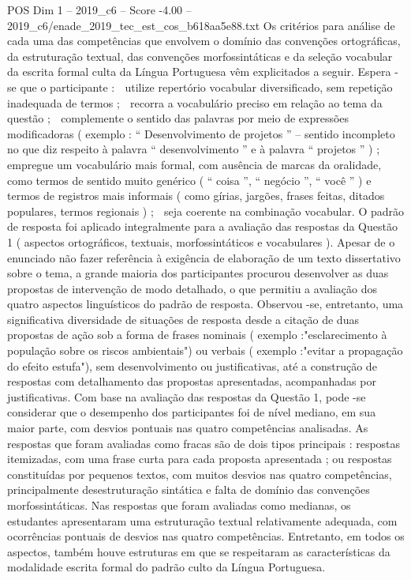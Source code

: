 \begin{textsample}{POS Dim 1 – 2019\_c6 – Score -4.00 – 2019\_c6/enade\_2019\_tec\_est\_cos\_b618aa5e88.txt}
Os critérios para análise de cada uma das competências que envolvem o domínio das convenções ortográficas, da estruturação textual, das convenções morfossintáticas e da seleção vocabular da escrita formal culta da Língua Portuguesa vêm explicitados a seguir.
Espera -se que o participante :  utilize repertório vocabular diversificado, sem repetição inadequada de termos ;  recorra a vocabulário preciso em relação ao tema da questão ;  complemente o sentido das palavras por meio de expressões modificadoras ( exemplo : “ Desenvolvimento de projetos ” – sentido incompleto no que diz respeito à palavra “ desenvolvimento ” e à palavra “ projetos ” ) ;  empregue um vocabulário mais formal, com ausência de marcas da oralidade, como termos de sentido muito genérico ( “ coisa ”, “ negócio ”, “ você ” ) e termos de registros mais informais ( como gírias, jargões, frases feitas, ditados populares, termos regionais ) ;  seja coerente na combinação vocabular.
O padrão de resposta foi aplicado integralmente para a avaliação das respostas da Questão 1 ( aspectos ortográficos, textuais, morfossintáticos e vocabulares ).
Apesar de o enunciado não fazer referência à exigência de elaboração de um texto dissertativo sobre o tema, a grande maioria dos participantes procurou desenvolver as duas propostas de intervenção de modo detalhado, o que permitiu a avaliação dos quatro aspectos linguísticos do padrão de resposta.
Observou -se, entretanto, uma significativa diversidade de situações de resposta desde a citação de duas propostas de ação sob a forma de frases nominais ( exemplo :"esclarecimento à população sobre os riscos ambientais") ou verbais ( exemplo :"evitar a propagação do efeito estufa"), sem desenvolvimento ou justificativas, até a construção de respostas com detalhamento das propostas apresentadas, acompanhadas por justificativas.
Com base na avaliação das respostas da Questão 1, pode -se considerar que o desempenho dos participantes foi de nível mediano, em sua maior parte, com desvios pontuais nas quatro competências analisadas.
As respostas que foram avaliadas como fracas são de dois tipos principais : respostas itemizadas, com uma frase curta para cada proposta apresentada ; ou respostas constituídas por pequenos textos, com muitos desvios nas quatro competências, principalmente desestruturação sintática e falta de domínio das convenções morfossintáticas.
Nas respostas que foram avaliadas como medianas, os estudantes apresentaram uma estruturação textual relativamente adequada, com ocorrências pontuais de desvios nas quatro competências.
Entretanto, em todos os aspectos, também houve estruturas em que se respeitaram as características da modalidade escrita formal do padrão culto da Língua Portuguesa.

\end{textsample}
